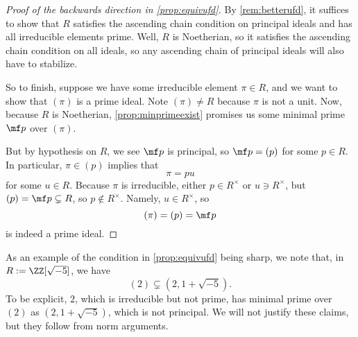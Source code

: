 \documentclass[../notes.tex]{subfiles}
\begin{document}
\begin{proof}[Proof of the backwards direction in \autoref{prop:equivufd}]
	By \autoref{rem:betterufd}, it suffices to show that $R$ satisfies the ascending chain condition on principal ideals and has all irreducible elements prime. Well, $R$ is Noetherian, so it satisfies the ascending chain condition on all ideals, so any ascending chain of principal ideals will also have to stabilize.

	So to finish, suppose we have some irreducible element $\pi\in R$, and we want to show that $(\pi)$ is a prime ideal. Note $(\pi)\ne R$ because $\pi$ is not a unit. Now, because $R$ is Noetherian, \autoref{prop:minprimeexist} promises us some minimal prime $\mf p$ over $(\pi)$.

	But by hypothesis on $R$, we see $\mf p$ is principal, so $\mf p=(p)$ for some $p\in R$. In particular, $\pi\in(p)$ implies that
	\[\pi=pu\]
	for some $u\in R$. Because $\pi$ is irreducible, either $p\in R^\times$ or $u\ni R^\times$, but $(p)=\mf p\subsetneq R$, so $p\notin R^\times$. Namely, $u\in R^\times$, so
	\[(\pi)=(p)=\mf p\]
	is indeed a prime ideal.
\end{proof}
\begin{remark}[Nir]
	As an example of the condition in \autoref{prop:equivufd} being sharp, we note that, in $R:=\ZZ[\sqrt{-5}]$, we have
	\[(2)\subsetneq\left(2,1+\sqrt{-5}\right).\]
	To be explicit, $2$, which is irreducible but not prime, has minimal prime over $(2)$ as $\left(2,1+\sqrt{-5}\right)$, which is not principal. We will not justify these claims, but they follow from norm arguments.
\end{remark}
\end{document}
